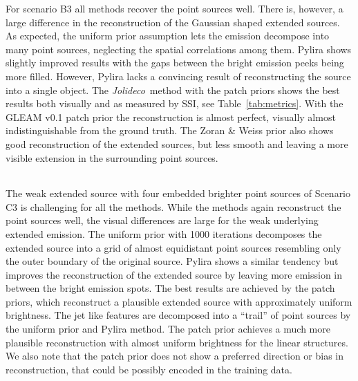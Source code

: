 \documentclass[twocolumn, linenumbers]{aastex631}
\newcommand{\jolideco}{\textit{Jolideco}~}
\begin{document}
    For scenario B3 all methods recover the point sources well.  There is, however, a large difference  in the reconstruction of the Gaussian shaped extended sources. As expected, the uniform prior assumption lets the emission decompose into many point sources, neglecting the spatial correlations among them. Pylira shows slightly improved results with the gaps between the bright emission peeks being more filled. However, Pylira lacks a convincing result of reconstructing the source into a single object. The \jolideco method with the patch priors shows the best results both visually and as measured by SSI, see Table~\ref{tab:metrics}. With the GLEAM v0.1 patch prior the reconstruction is almost perfect, visually almost indistinguishable from the ground truth. The Zoran \& Weiss prior also shows good reconstruction of the extended sources, but less smooth and leaving a more visible extension in the surrounding point sources.
    \begin{table*}
    \centering
        \begin{tabular}{ c|c|c|c|c|c } 
            
        \end{tabular}
        \label{tab:metrics}
        \caption{Image metrics for the different source scenarios and methods shown in Figure~\ref{fig:comparison-scenarios}. The first number in a cell shows the structural similarity index (SSI, the closer to unity, the better) and the second number shows the normalized root mean square (NRMSE, the lower the better).}
    \end{table*}
    The weak extended source with four embedded brighter point sources of Scenario C3 is challenging for all the methods. While the methods again reconstruct the point sources well, the visual differences are large for the weak underlying extended emission. The uniform prior with 1000 iterations decomposes the extended source into a grid of almost equidistant point sources resembling only the outer boundary of the original source. Pylira shows a similar tendency but improves the reconstruction of the extended source by leaving more emission in between the bright emission spots. The best results are achieved by the patch priors, which reconstruct a plausible extended source with approximately uniform brightness. The jet like features are decomposed into a \enquote{trail} of point sources by the uniform prior and Pylira method. The patch prior achieves a much more plausible reconstruction with almost uniform brightness for the linear structures. We also note that the patch prior does not show a preferred direction or bias in reconstruction, that could be possibly encoded in the training data.
    
\end{document}

